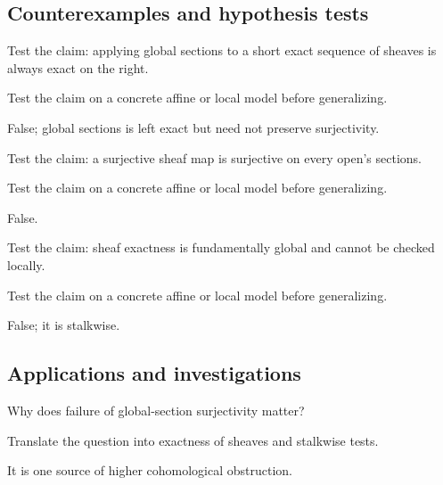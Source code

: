 \subsection*{Counterexamples and hypothesis tests}

\begin{exercise}\label{exr:vi16-expand-10}
Test the claim: applying global sections to a short exact sequence of sheaves is always exact on the right.
\end{exercise}
\begin{hint}
Test the claim on a concrete affine or local model before generalizing.
\end{hint}
\begin{solution}
False; global sections is left exact but need not preserve surjectivity.
\end{solution}

\begin{exercise}\label{exr:vi16-expand-11}
Test the claim: a surjective sheaf map is surjective on every open's sections.
\end{exercise}
\begin{hint}
Test the claim on a concrete affine or local model before generalizing.
\end{hint}
\begin{solution}
False.
\end{solution}

\begin{exercise}\label{exr:vi16-expand-12}
Test the claim: sheaf exactness is fundamentally global and cannot be checked locally.
\end{exercise}
\begin{hint}
Test the claim on a concrete affine or local model before generalizing.
\end{hint}
\begin{solution}
False; it is stalkwise.
\end{solution}

\subsection*{Applications and investigations}

\begin{exercise}\label{exr:vi16-expand-13}
Why does failure of global-section surjectivity matter?
\end{exercise}
\begin{hint}
Translate the question into exactness of sheaves and stalkwise tests.
\end{hint}
\begin{solution}
It is one source of higher cohomological obstruction.
\end{solution}

